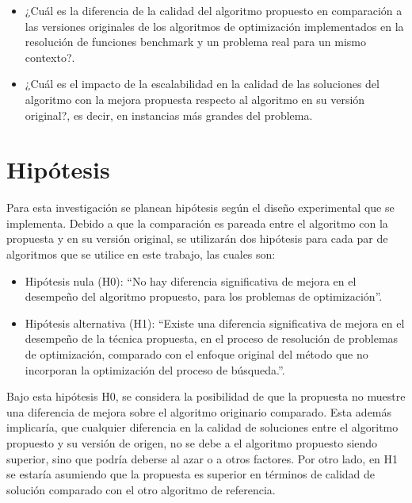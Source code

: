 \begin{itemize}
    \item ¿Cuál es la diferencia de la calidad del algoritmo propuesto en comparación a las versiones originales de los algoritmos de optimización implementados en la resolución de funciones benchmark y un problema real para un mismo contexto?. %

    \item ¿Cuál es el impacto de la escalabilidad en la calidad de las soluciones del algoritmo con la mejora propuesta respecto al algoritmo en su versión original?, es decir, en instancias más grandes del problema. %

\end{itemize}










\section{Hipótesis}
\label{sc:HIPO}

Para esta investigación se planean hipótesis según el diseño experimental que se implementa. Debido a que la comparación es pareada entre el algoritmo con la propuesta y en su versión original, se utilizarán dos hipótesis para cada par de algoritmos que se utilice en este trabajo, las cuales son:
\begin{itemize}
    \item Hipótesis nula (H0): ``No hay diferencia significativa de mejora en el desempeño del algoritmo propuesto, para los problemas de optimización''.

    \item Hipótesis alternativa (H1): ``Existe una diferencia significativa de mejora en el desempeño de la técnica propuesta, en el proceso de resolución de problemas de optimización, comparado con el enfoque original del método que no incorporan la optimización del proceso de búsqueda.''.

\end{itemize}


Bajo esta hipótesis H0, se considera la posibilidad de que la propuesta no muestre una diferencia de mejora sobre el algoritmo originario comparado. Esta además implicaría, que cualquier diferencia en la calidad de soluciones entre el algoritmo propuesto y su versión de origen, no se debe a el algoritmo propuesto siendo superior, sino que podría deberse al azar o a otros factores. Por otro lado, en H1 se estaría asumiendo que la propuesta es superior en términos de calidad de solución comparado con el otro algoritmo de referencia.

